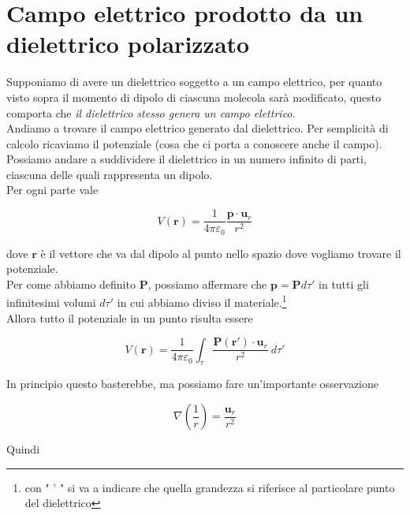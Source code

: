\section{Campo elettrico prodotto da un dielettrico polarizzato}

Supponiamo di avere un dielettrico soggetto a un campo elettrico, per quanto visto sopra il momento di dipolo di ciascuna molecola sarà modificato, questo comporta che \emph{il dielettrico stesso genera un campo elettrico}.\\

Andiamo a trovare il campo elettrico generato dal dielettrico. Per semplicità di calcolo ricaviamo il potenziale (cosa che ci porta a conoscere anche il campo).\\

Possiamo andare a suddividere il dielettrico in un numero infinito di parti, ciascuna delle quali rappresenta un dipolo.\\ Per ogni parte vale

\begin{equation*}
    V(\mathbf{r}) = \frac{1}{4 \pi \varepsilon_0} \frac{\mathbf{p} \cdot \mathbf{u}_r}{r^2}
\end{equation*}

dove $\mathbf{r}$ è il vettore che va dal dipolo al punto nello spazio dove vogliamo trovare il potenziale. \\

Per come abbiamo definito $\mathbf{P}$, possiamo affermare che $\mathbf{p} = \mathbf{P} d\tau'$ in tutti gli infinitesimi volumi $d \tau '$ in cui abbiamo diviso il materiale.\footnote{con " ' " si va a indicare che quella grandezza si riferisce al particolare punto del dielettrico} \\

Allora tutto il potenziale in un punto risulta essere 

\begin{equation}
    V(\mathbf{r}) = \frac{1}{4 \pi \varepsilon_0} \int_{\tau} \frac{\mathbf{P}(\mathbf{r'}) \cdot \mathbf{u}_r}{r^2} \ d \tau '
\end{equation}

In principio questo basterebbe, ma possiamo fare un'importante osservazione 

\begin{equation}
    \nabla \left(\frac{1}{r} \right) = \frac{\mathbf{u}_r}{r^2}
\end{equation}

Quindi

